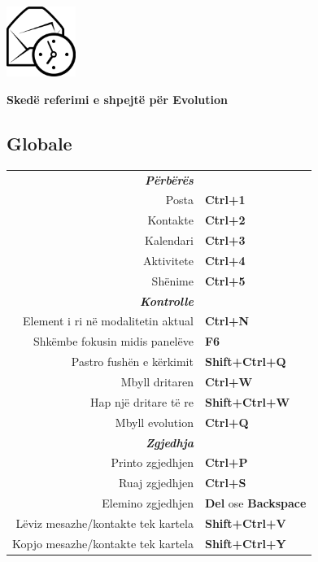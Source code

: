 \documentclass[12pt]{article}
\date {}
\begin{document}
	\begin{landscape}


	\begin{center}
	\begin{minipage}[m]
		{1in}\includegraphics[height=0.9in]{../evolution-logo.eps}\hspace{5mm}
	\end{minipage}
	\hspace{5mm}
	\textbf{\Huge{Skedë referimi e shpejtë për Evolution}}
	\end{center}

	\begin{center}
	\begin{multicols}{2}
	\section*{Globale}
	\begin{tabular*}{4in}{rp{1.5in}}
		\textit{\textbf{Përbërës}}		&					\\
		Posta					& \textbf{Ctrl+1}			\\
		Kontakte				& \textbf{Ctrl+2}			\\
		Kalendari				& \textbf{Ctrl+3}			\\
		Aktivitete					& \textbf{Ctrl+4}			\\
		\vspace{1.5mm}
		Shënime					& \textbf{Ctrl+5}			\\
		\textit{\textbf{Kontrolle}}		&					\\
		Element i ri në modalitetin aktual		& \textbf{Ctrl+N}			\\
		Shkëmbe fokusin midis panelëve		& \textbf{F6}				\\
		Pastro fushën e kërkimit			& \textbf{Shift+Ctrl+Q}			\\
		Mbyll dritaren				& \textbf{Ctrl+W}			\\
		Hap një dritare të re				& \textbf{Shift+Ctrl+W}			\\
		\vspace{1.5mm}
		Mbyll evolution				& \textbf{Ctrl+Q}			\\
		\textit{\textbf{Zgjedhja}}		&					\\
		Printo zgjedhjen				& \textbf{Ctrl+P}			\\
		Ruaj zgjedhjen				& \textbf{Ctrl+S}			\\
		Elemino zgjedhjen			& \textbf{Del} ose \textbf{Backspace}	\\
		Lëviz mesazhe/kontakte tek kartela		& \textbf{Shift+Ctrl+V}			\\
		Kopjo mesazhe/kontakte tek kartela		& \textbf{Shift+Ctrl+Y}			\\
	\end{tabular*}

\end{multicols}
\end{center}
\end{landscape}
\end{document}
